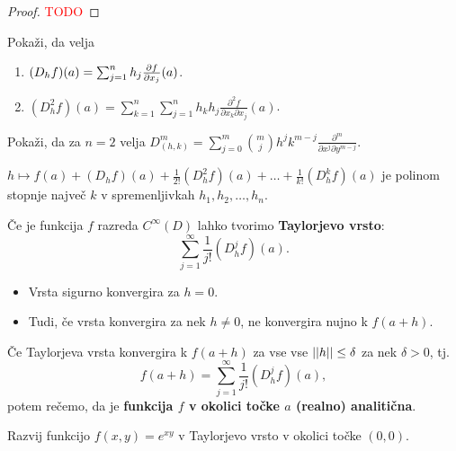 \begin{proof}
    \textcolor{red}{TODO}
\end{proof}

\begin{opomba}
    Pokaži, da velja
    \begin{enumerate}
        \item $(D_hf)(a) = \sum_{j=1}^{n}h_j \frac{\partial f}{\partial x_j}(a)$.
        \item $(D_h^2f)(a) = \sum_{k=1}^{n} \sum_{j=1}^{n}h_kh_j \frac{\partial^2f}{\partial x_k \partial x_j}(a)$. 
    \end{enumerate}
\end{opomba}

\begin{primer}
    Pokaži, da za $n=2$ velja $D_{(h,k)}^m = \sum_{j=0}^{m} \binom{m}{j} h^j k^{m-j} \frac{\partial^m}{\partial x^j \partial y^{m-j}}$.
\end{primer}

\begin{opomba}
    $h \mapsto f(a) + (D_hf)(a) + \frac{1}{2!}(D_h^2f)(a) + \ldots + \frac{1}{k!} (D_h^kf)(a) $ je polinom stopnje največ $k$ v spremenljivkah $h_1, h_2, \ldots, h_n$.
\end{opomba}

\begin{opomba}
    Če je funkcija $f$ razreda $C^\infty(D)$ lahko tvorimo \textbf{Taylorjevo vrsto}:
    $$\sum_{j=1}^{\infty} \frac{1}{j!} (D_h^j f)(a).$$
    \begin{itemize}
        \item Vrsta sigurno konvergira za $h=0$.
        \item Tudi, če vrsta konvergira za nek $h \neq 0$, ne konvergira nujno k $f(a+h)$.
    \end{itemize}
\end{opomba}

\begin{definicija}
    Če Taylorjeva vrsta konvergira k $f(a+h)$ za vse vse $||h|| \leq \delta$ za nek $\delta > 0$, tj. 
    $$f(a+h) = \sum_{j=1}^{\infty} \frac{1}{j!} (D_h^j f)(a),$$
    potem rečemo, da je \textbf{funkcija $f$ v okolici točke $a$ (realno) analitična}.
\end{definicija}

\begin{zgled}
    Razvij funkcijo $f(x,y) = e^{xy}$ v Taylorjevo vrsto v okolici točke $(0,0)$.
\end{zgled}

